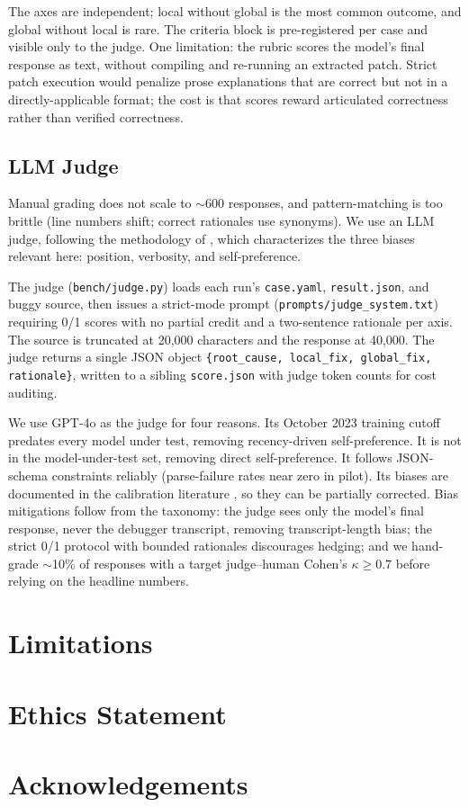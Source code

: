 \documentclass[11pt]{article}
\begin{document}
The axes are independent; local without global is the most common outcome, and global without local is rare. The criteria block is pre-registered per case and visible only to the judge. One limitation: the rubric scores the model's final response as text, without compiling and re-running an extracted patch. Strict patch execution would penalize prose explanations that are correct but not in a directly-applicable format; the cost is that scores reward articulated correctness rather than verified correctness.

\subsection{LLM Judge}
\label{sec:methods:judge}

Manual grading does not scale to $\sim$600 responses, and pattern-matching is too brittle (line numbers shift; correct rationales use synonyms). We use an LLM judge, following the methodology of \citet{zheng2023judging}, which characterizes the three biases relevant here: position, verbosity, and self-preference.

The judge (\texttt{bench/judge.py}) loads each run's \texttt{case.yaml}, \texttt{result.json}, and buggy source, then issues a strict-mode prompt (\texttt{prompts/judge\_system.txt}) requiring 0/1 scores with no partial credit and a two-sentence rationale per axis. The source is truncated at 20{,}000 characters and the response at 40{,}000. The judge returns a single JSON object \texttt{\{root\_cause, local\_fix, global\_fix, rationale\}}, written to a sibling \texttt{score.json} with judge token counts for cost auditing.

We use GPT-4o as the judge for four reasons. Its October 2023 training cutoff predates every model under test, removing recency-driven self-preference. It is not in the model-under-test set, removing direct self-preference. It follows JSON-schema constraints reliably (parse-failure rates near zero in pilot). Its biases are documented in the calibration literature \citep{zheng2023judging,gu2024llmjudgesurvey}, so they can be partially corrected. Bias mitigations follow from the taxonomy: the judge sees only the model's final response, never the debugger transcript, removing transcript-length bias; the strict 0/1 protocol with bounded rationales discourages hedging; and we hand-grade $\sim$10\% of responses with a target judge--human Cohen's $\kappa \geq 0.7$ before relying on the headline numbers.

\section*{Limitations}

\section*{Ethics Statement}

\section*{Acknowledgements}



\end{document}
